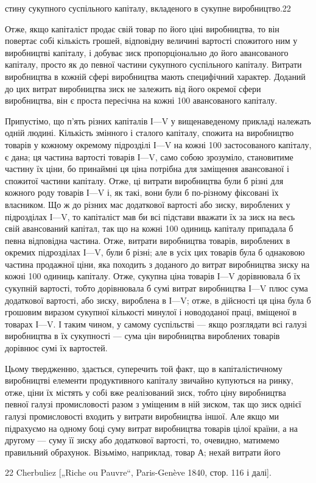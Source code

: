 стину сукупного суспільного капіталу, вкладеного в сукупне
виробництво.22

Отже, якщо капіталіст продає свій товар по його ціні виробництва, то він повертає собі кількість
грошей, відповідну величині вартості спожитого ним у виробництві капіталу, і добуває зиск
пропорціонально до його авансованого капіталу, просто
як до певної частини сукупного суспільного капіталу. Витрати
виробництва в кожній сфері виробництва мають специфічний
характер. Доданий до цих витрат виробництва зиск не залежить від його окремої сфери виробництва, він
є проста пересічна
на кожні 100 авансованого капіталу.

Припустімо, що п’ять різних капіталів І—V у вищенаведеному прикладі належать одній людині. Кількість
змінного і сталого капіталу, спожита на виробництво товарів у кожному окремому підрозділі І—V на
кожні 100 застосованого капіталу,
є дана; ця частина вартості товарів І—V, само собою зрозуміло, становитиме частину їх ціни, бо
принаймні ця ціна потрібна для заміщення авансованої і спожитої частини капіталу. Отже, ці витрати
виробництва були б різні для кожного роду
товарів І—V і, як такі, вони були б по-різному фіксовані їх власником. Що ж до різних мас додаткової
вартості або зиску, вироблених у підрозділах І—V, то капіталіст мав би всі підстави вважати їх за
зиск на весь свій авансований капітал, так що
на кожні 100 одиниць капіталу припадала б певна відповідна
частина. Отже, витрати виробництва товарів, вироблених в окремих підрозділах І—V, були б різні; але
в усіх цих товарів
була б однаковою частина продажної ціни, яка походить з доданого до витрат виробництва зиску на
кожні 100 одиниць капіталу. Отже, сукупна ціна товарів І—V дорівнювала б їх сукупній вартості, тобто
дорівнювала б сумі витрат виробництва
І—V плюс сума додаткової вартості, або зиску, вироблена в
І—V; отже, в дійсності ця ціна була б грошовим виразом сукупної кількості минулої і новододаної
праці, вміщеної в товарах
І—V. І таким чином, у самому суспільстві — якщо розглядати
всі галузі виробництва в їх сукупності — сума цін виробництва
вироблених товарів дорівнює сумі їх вартостей.

Цьому твердженню, здається, суперечить той факт, що в
капіталістичному виробництві елементи продуктивного капіталу
звичайно купуються на ринку, отже, ціни їх містять у собі вже
реалізований зиск, тобто ціну виробництва певної галузі промисловості разом з уміщеним в ній зиском,
так що зиск однієї
галузі промисловості входить у витрати виробництва іншої.
Але якщо ми підрахуємо на одному боці суму витрат виробництва товарів цілої країни, а на другому —
суму її зиску або додаткової вартості, то, очевидно, матимемо правильний обрахунок. Візьмімо,
наприклад, товар А; нехай витрати його

22 Cherbuliez [„Riche ou Pauvre“, Paris-Genève 1840, стор. 116 і далі].
